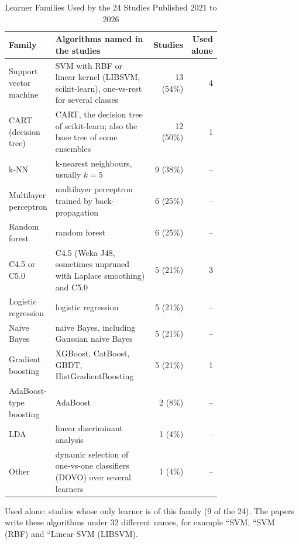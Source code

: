 \begin{table}[t]
  \caption{Learner Families Used by the 24 Studies Published 2021 to 2026}
  \label{tab:empirical-families}
  \footnotesize
  \setlength{\tabcolsep}{4pt}
  \begin{tabular}{@{}>{\raggedright\arraybackslash}p{0.22\linewidth}>{\raggedright\arraybackslash}p{0.5\linewidth}rr@{}}
    \toprule
    Family & Algorithms named in the studies & Studies & Used alone\\
    \midrule
    Support vector machine & SVM with RBF or linear kernel (LIBSVM, scikit-learn), one-vs-rest for several classes & 13 (54\%) & 4\\
    CART (decision tree) & CART, the decision tree of scikit-learn; also the base tree of some ensembles & 12 (50\%) & 1\\
    k-NN & k-nearest neighbours, usually $k = 5$ & 9 (38\%) & --\\
    Multilayer perceptron & multilayer perceptron trained by back-propagation & 6 (25\%) & --\\
    Random forest & random forest & 6 (25\%) & --\\
    C4.5 or C5.0 & C4.5 (Weka J48, sometimes unpruned with Laplace smoothing) and C5.0 & 5 (21\%) & 3\\
    Logistic regression & logistic regression & 5 (21\%) & --\\
    Naive Bayes & naive Bayes, including Gaussian naive Bayes & 5 (21\%) & --\\
    Gradient boosting & XGBoost, CatBoost, GBDT, HistGradientBoosting & 5 (21\%) & 1\\
    AdaBoost-type boosting & AdaBoost & 2 (8\%) & --\\
    LDA & linear discriminant analysis & 1 (4\%) & --\\
    Other & dynamic selection of one-vs-one classifiers (DOVO) over several learners & 1 (4\%) & --\\
    \bottomrule
  \end{tabular}
  \par\smallskip\raggedright\scriptsize Used alone: studies whose only learner is of this family (9 of the 24). The papers write these algorithms under 32 different names, for example ``SVM, ``SVM (RBF) and ``Linear SVM (LIBSVM).
\end{table}
